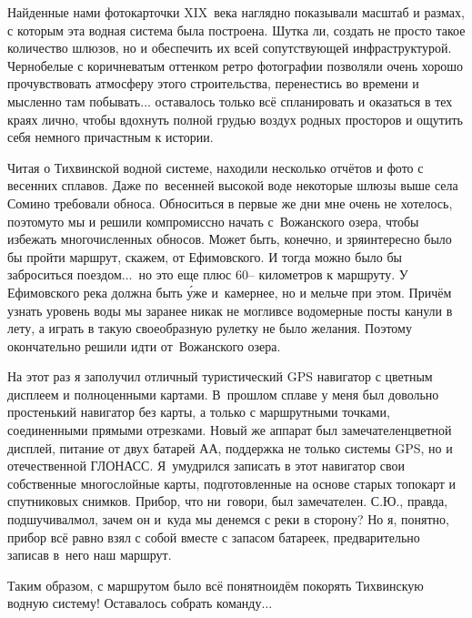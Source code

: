 Найденные нами фотокарточки XIX~века наглядно показывали масштаб и размах, с которым эта водная система была построена. Шутка ли, создать не просто такое количество шлюзов, но и обеспечить их всей сопутствующей инфраструктурой. Черно\sdash белые с коричневатым оттенком ретро фотографии позволяли очень хорошо прочувствовать атмосферу этого строительства, перенестись во времени и мысленно там побывать$\ldots$ оставалось только всё спланировать и оказаться в тех краях лично, чтобы вдохнуть полной грудью воздух родных просторов и ощутить себя немного причастным к истории.

Читая о Тихвинской водной системе, находили несколько отчётов и фото с весенних сплавов. Даже по~весенней высокой воде некоторые шлюзы выше села Сомино требовали обноса. Обноситься в первые же дни мне очень не хотелось, поэтому\sdash то мы и решили компромиссно начать с~Вожанского озера, чтобы избежать многочисленных обносов. Может быть, конечно, и зря\mdash интересно было бы пройти маршрут, скажем, от Ефимовского. И тогда можно было бы заброситься поездом$\ldots$~но это еще плюс 60\thinspace\nobreakdash-- километров к маршруту. У Ефимовского река должна быть \'{у}же и~камернее, но и мельче при этом. Причём узнать уровень воды мы заранее никак не могли\mdash все водомерные посты канули в лету, а играть в такую своеобразную рулетку не было желания. Поэтому окончательно решили идти от~Вожанского озера. 

На этот раз я заполучил отличный туристический GPS навигатор с цветным дисплеем и полноценными картами. В~прошлом сплаве у меня был довольно простенький навигатор без карты, а только с маршрутными точками, соединенными прямыми отрезками. Новый же аппарат был замечателен\mdash цветной дисплей, питание от двух батарей АА, поддержка не только системы GPS, но и отечественной ГЛОНАСС. Я~умудрился записать в этот навигатор свои собственные многослойные карты, подготовленные на основе старых топокарт и спутниковых снимков. Прибор, что ни~говори, был замечателен. С.Ю., правда, подшучивал\mdash мол, зачем он и~куда мы денемся с реки в сторону? Но я, понятно, прибор всё равно взял с собой вместе с запасом батареек, предварительно записав в~него наш маршрут.

Таким образом, с маршрутом было всё понятно\mdash идём покорять Тихвинскую водную систему! Оставалось собрать команду$\ldots$

\begin{center}
\end{center}
